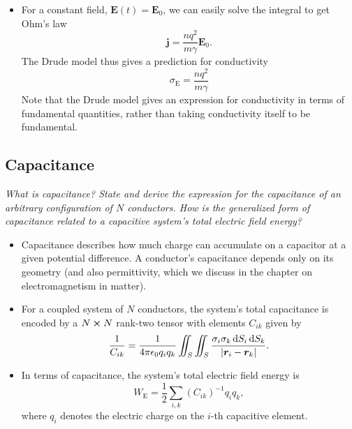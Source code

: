 \documentclass[11pt, a4paper]{article}
\newcommand{\diff}{\mathop{}\!\mathrm{d}} %
\renewcommand{\vec}[1]{\bm{#1}} %
\renewcommand{\r}{\vec{r}}
\newcommand{\E}{\vec{E}} %
\newcommand{\ee}{\epsilon_{0}}  %
\renewcommand{\j}{\vec{j}}  %
\begin{document}
\begin{itemize}
	\item For a constant field, $ \E(t) = \E_{0} $, we can easily solve the integral to get Ohm's law
	\begin{equation*}
		\j = \frac{nq^{2}}{m\gamma}\E_{0}.
	\end{equation*}
	The Drude model thus gives a prediction for conductivity
	\begin{equation*}
		\sigma_{\mathrm{E}} = \frac{nq^{2}}{m \gamma}
	\end{equation*}
    Note that the Drude model gives an expression for conductivity in terms of fundamental quantities, rather than taking conductivity itself to be fundamental.

\end{itemize}
	



\subsection{Capacitance}
\textit{What is capacitance? State and derive the expression for the capacitance of an arbitrary configuration of $ N $ conductors. How is the generalized form of capacitance related to a capacitive system's total electric field energy?}

\begin{itemize}
    \item Capacitance describes how much charge can accumulate on a capacitor at a given potential difference. A conductor's capacitance depends only on its geometry (and also permittivity, which we discuss in the chapter on electromagnetism in matter).

	\item For a coupled system of $ N $ conductors, the system's total capacitance is encoded by a $ N \cross N $ rank-two tensor with elements $ C_{ik} $ given by
	\begin{equation*}
		\frac{1}{C_{ik}} = \frac{1}{4\pi \ee q_{i} q_{k}} \iint_{S} \iint_{S} \frac{\sigma_{i}\sigma_{k}\diff S_{i}\diff S_{k}}{\abs{\r_{i} - \r_{k}}}.
	\end{equation*}

	\item In terms of capacitance, the system's total electric field energy is
	\begin{equation*}
		W_{\text{E}} = \frac{1}{2}\sum_{i, k}(C_{ik})^{-1}q_{i}q_{k},
	\end{equation*}
    where $ q_{i} $ denotes the electric charge on the $ i $-th capacitive element.

\end{itemize}
\end{document}
